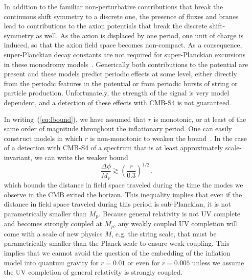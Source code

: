 In addition to the familiar non-perturbative contributions that break the continuous shift symmetry to a discrete one, the presence of fluxes and branes lead to contributions to the axion potentials that break the discrete shift-symmetry as well. As the axion is displaced by one period, one unit of charge is induced, so that the axion field space becomes non-compact. As a consequence, super-Planckian decay constants are not required for super-Planckian excursions in these monodromy models~\cite{Silverstein:2008sg, McAllister:2008hb, Kaloper:2008fb, Berg:2009tg, Palti:2014kza,McAllister:2014mpa, Marchesano:2014mla, Blumenhagen:2015xpa,Hebecker:2015tzo}. Generically both contributions to the potential are present and these models predict periodic effects at some level, either directly from the periodic features in the potential or from periodic bursts of string or particle production. Unfortunately, the strength of the signal is very model dependent, and a detection of these effects with CMB-S4 is not guaranteed.

In writing~(\ref{eq:lbound}), we have assumed that $r$ is monotonic, or at least of the same order of magnitude throughout the inflationary period. One can easily construct models in which $r$ is non-monotonic to weaken the bound~\cite{BenDayan:2009kv,Hotchkiss:2011gz, Chatterjee:2014hna}. In the case of a detection with CMB-S4 of a spectrum that is at least approximately scale-invariant, we can write the weaker bound
\begin{equation}
\frac{\Delta\phi}{M_p}\gtrsim\left(\frac{r}{0.3}\right)^{1/2}\,,
\end{equation}
which bounds the distance in field space traveled during the time the modes we observe in the CMB exited the horizon. This inequality implies that even if the distance in field space traveled during this period is sub-Planckian, it is not parametrically smaller than $M_p$. Because general relativity is not UV complete and becomes strongly coupled at $M_p$, any weakly coupled UV completion will come with a scale of new physics $M$, e.g. the string scale, that must be parametrically smaller than the Planck scale to ensure weak coupling. This implies that we cannot avoid the question of the embedding of the inflation model into quantum gravity for $r=0.01$ or even for $r=0.005$ unless we assume the UV completion of general relativity is strongly coupled. 

